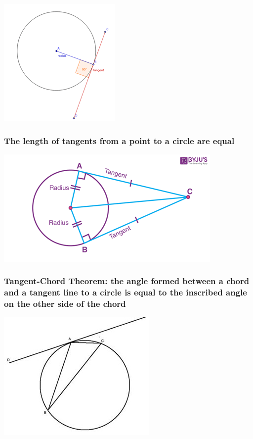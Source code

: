 \documentclass{article}
\begin{document}
\includegraphics{Picture6.png}

\pagebreak

\subsubsection{The length of tangents from a point to a circle are equal}

\includegraphics{Picture7.png}

\vspace{50px}

\subsubsection{Tangent-Chord Theorem: the angle formed between a chord and a tangent line to a circle is equal to the inscribed angle on the other side of the chord}

\includegraphics{Picture8.jpg}
\end{document}
